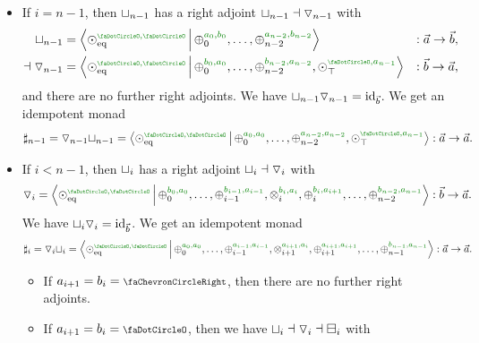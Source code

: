 \documentclass[a4paper]{memoir}
\begin{document}
\begin{example}
\begin{itemize}
\begin{itemize}
\begin{align*}
			\end{align*}
			\begin{itemize}
				\item If $a_i = \ypolar$, then there are no further left adjoints.
				\item If $a_i = \npolar$, then $\cohpi_i = \cohfget_{i-1}$ and we can continue.
			\end{itemize}
		\end{itemize}
		\item If $i = n-1$, then ${\sqcup}_{n-1}$ has a right adjoint ${\sqcup}_{n-1} \dashv {\triangledown}_{n-1}$ with
		\begin{align*}
			\cohfget_{n-1} &= \reshlist{\nonpol_\eqtydeg\pmrhom{\npolar}{\npolar}}{\pospol_0\pmrhom{a_0}{b_0}, \ldots, \pospol_{n-2}\pmrhom{a_{n-2}}{b_{n-2}}} &: \vec a \to \vec b, \\
			\dashv
			\cohcodisc_{n-1} &= \reshlist{\nonpol_\eqtydeg\pmrhom{\npolar}{\npolar}}{\pospol_0\pmrhom{b_0}{a_0}, \ldots, \pospol_{n-2}\pmrhom{b_{n-2}}{a_{n-2}}, \nonpol_\top\pmrhom{\npolar}{a_{n-1}}} &: \vec b \to \vec a,
		\end{align*}
		and there are no further right adjoints.
		We have ${\sqcup}_{n-1} {\triangledown}_{n-1} = \mathrm{id}_{\vec b}$.
		We get an idempotent monad
		\[
			\sharp_{n-1} = \cohcodisc_{n-1} \cohfget_{n-1} = \reshlist{\nonpol_\eqtydeg\pmrhom{\npolar}{\npolar}}{\pospol_0\pmrhom{a_0}{a_0}, \ldots, \pospol_{n-2}\pmrhom{a_{n-2}}{a_{n-2}}, \nonpol_\top\pmrhom{\npolar}{a_{n-1}}} : \vec a \to \vec a.
		\]
		\item If $i < n-1$, then ${\sqcup}_i$ has a right adjoint ${\sqcup}_i \dashv {\triangledown}_i$ with
		\[
			\cohcodisc_i = \reshlist{\nonpol_\eqtydeg\pmrhom{\npolar}{\npolar}}{\pospol_0\pmrhom{b_0}{a_0}, \ldots, \pospol_{i-1}\pmrhom{b_{i-1}}{a_{i-1}}, \mixpol_{i}\pmrhom{b_i}{a_i}, \pospol_{i}\pmrhom{b_i}{a_{i+1}}, \ldots, \pospol_{n-2}\pmrhom{b_{n-2}}{a_{n-1}}} : \vec b \to \vec a.
		\]
		We have ${\sqcup}_i {\triangledown}_i = \mathrm{id}_{\vec b}$. We get an idempotent monad
		\[
			\sharp_i = \cohcodisc_i \cohfget_i = \reshlist{\nonpol_\eqtydeg\pmrhom{\npolar}{\npolar}}{\pospol_0\pmrhom{a_0}{a_0}, \ldots, \pospol_{i-1}\pmrhom{a_{i-1}}{a_{i-1}}, \mixpol_{i+1}\pmrhom{a_{i+1}}{a_i}, \pospol_{i+1}\pmrhom{a_{i+1}}{a_{i+1}}, \ldots, \pospol_{n-1}\pmrhom{b_{n-1}}{a_{n-1}}} : \vec a \to \vec a.
		\]
		\begin{itemize}
			\item If $a_{i+1} = b_i = \ypolar$, then there are no further right adjoints.
			\item If $a_{i+1} = b_i = \npolar$, then we have ${\sqcup}_i \dashv {\triangledown}_i \dashv {\boxminus}_i$ with

\end{itemize}
\end{itemize}
\end{example}
\end{document}
